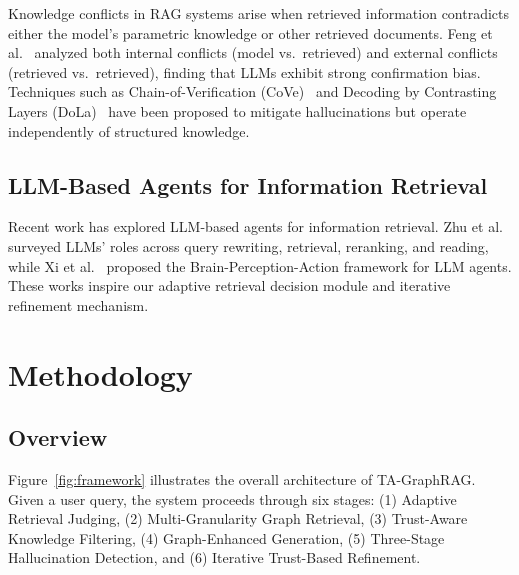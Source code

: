 \documentclass[11pt,a4paper]{article}
\begin{document}
Knowledge conflicts in RAG systems arise when retrieved information contradicts either the model's parametric knowledge or other retrieved documents. Feng et al.~\cite{feng2023trends} analyzed both internal conflicts (model vs.\ retrieved) and external conflicts (retrieved vs.\ retrieved), finding that LLMs exhibit strong confirmation bias. Techniques such as Chain-of-Verification (CoVe)~\cite{dhuliawala2023chain} and Decoding by Contrasting Layers (DoLa)~\cite{chuang2023dola} have been proposed to mitigate hallucinations but operate independently of structured knowledge.

\subsection{LLM-Based Agents for Information Retrieval}

Recent work has explored LLM-based agents for information retrieval. Zhu et al.~\cite{zhu2024large} surveyed LLMs' roles across query rewriting, retrieval, reranking, and reading, while Xi et al.~\cite{xi2023rise} proposed the Brain-Perception-Action framework for LLM agents. These works inspire our adaptive retrieval decision module and iterative refinement mechanism.

\section{Methodology}

\subsection{Overview}

Figure~\ref{fig:framework} illustrates the overall architecture of TA-GraphRAG. Given a user query, the system proceeds through six stages: (1) Adaptive Retrieval Judging, (2) Multi-Granularity Graph Retrieval, (3) Trust-Aware Knowledge Filtering, (4) Graph-Enhanced Generation, (5) Three-Stage Hallucination Detection, and (6) Iterative Trust-Based Refinement.
\end{document}
